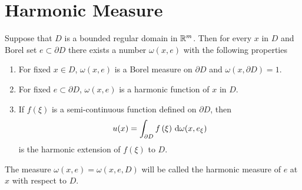 \section{Harmonic Measure}
\begin{theorem}
	Suppose that $D$ is a bounded regular domain in $\mathbb{R}^{m}$. Then for every $x$ in $D$ and Borel set $e\subset \partial D$ there exists a number $\omega(x,e)$ with the following properties
\begin{enumerate}
	\item For fixed $x\in D$, $\omega(x,e)$ is a Borel measure on $\partial D$ and $\omega(x,\partial D)=1$.
	\item For fixed $e\subset \partial D$, $\omega(x,e)$ is a harmonic function of $x$ in $D$.
	\item If $f(\xi )$ is a semi-continuous function defined on $\partial D$, then 
		\begin{equation}\label{eqn:harmonic-measure}
			u(x)=\int_{\partial D}f\left( \xi \right) \,\mathrm{d} \omega(x,e_\xi) 
		\end{equation}
		is the harmonic extension of $f(\xi)$ to $D$. 
\end{enumerate}
The measure $\omega(x,e)=\omega(x,e,D)$ will be called the harmonic measure of $e$ at $x$ with respect to $D$.
\end{theorem}
